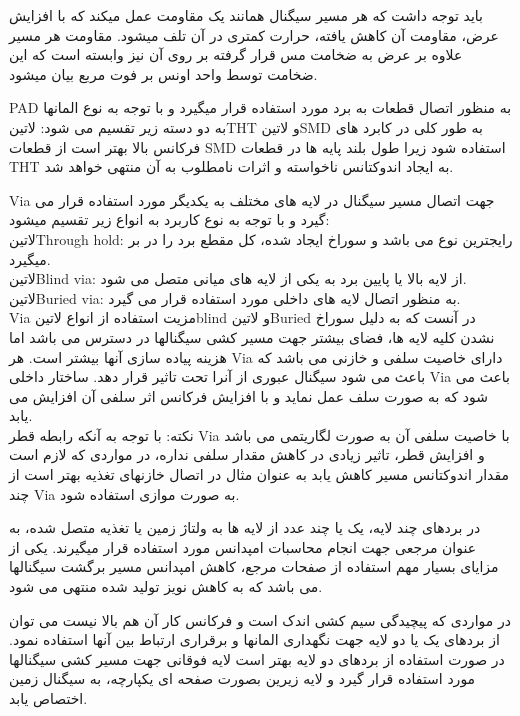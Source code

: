 باید توجه داشت که هر مسیر سیگنال همانند یک مقاومت عمل میکند که با افزایش عرض، مقاومت آن کاهش یافته، حرارت کمتری در آن تلف میشود. مقاومت هر مسیر علاوه بر عرض به ضخامت مس قرار گرفته بر روی آن نیز وابسته است که این ضخامت توسط واحد اونس بر فوت مربع بیان میشود.

PAD
به منظور اتصال قطعات به برد مورد استفاده قرار میگیرد و با توجه به نوع المانها به دو دسته زیر تقسیم می شود: ‌لاتین{THT} و ‌لاتین{SMD} به طور کلی در کابرد های فرکانس بالا بهتر است از قطعات SMD استفاده شود زیرا طول بلند پایه ها در قطعات THT به ایجاد اندوکتانس ناخواسته و اثرات نامطلوب به آن منتهی خواهد شد.

Via
جهت اتصال مسیر سیگنال در لایه های مختلف به یکدیگر مورد استفاده قرار می گیرد و با توجه به نوع کاربرد به انواع زیر تقسیم میشود:\\
‌لاتین{Through hold}: رایجترین نوع می باشد و سوراخ ایجاد شده، کل مقطع برد را در بر میگیرد.\\
‌لاتین{Blind via}: از لایه بالا یا پایین برد به یکی از لایه های میانی متصل می شود.\\
‌لاتین{Buried via}: به منظور اتصال لایه های داخلی مورد استفاده قرار می گیرد.\\
Via
مزیت استفاده از انواع ‌لاتین{blind} و ‌لاتین{Buried} در آنست که به دلیل سوراخ نشدن کلیه لایه ها، فضای بیشتر جهت مسیر کشی سیگنالها در دسترس می باشد اما هزینه پیاده سازی آنها بیشتر است.
هر Via دارای خاصیت سلفی و خازنی می باشد که باعث می شود سیگنال عبوری از آنرا تحت تاثیر قرار دهد.
ساختار داخلی Via باعث می شود که به صورت سلف عمل نماید و با افزایش فرکانس اثر سلفی آن افزایش می یابد. \\
نکته: با توجه به آنکه رابطه قطر Via با خاصیت سلفی آن به صورت لگاریتمی می باشد و افزایش قطر، تاثیر زیادی در کاهش مقدار سلفی نداره، در مواردی که لازم است مقدار اندوکتانس مسیر کاهش یابد به عنوان مثال در اتصال خازنهای تغذیه بهتر است از چند Via به صورت موازی استفاده شود.

در بردهای چند لایه، یک یا چند عدد از لایه ها به ولتاژ زمین یا تغذیه متصل شده، به عنوان مرجعی جهت انجام محاسبات امپدانس مورد استفاده قرار میگیرند. یکی از مزایای بسیار مهم استفاده از صفحات مرجع، کاهش امپدانس مسیر برگشت سیگنالها می باشد که به کاهش نویز تولید شده منتهی می شود.

در مواردی که پیچیدگی سیم کشی اندک است و فرکانس کار آن هم بالا نیست می توان از بردهای یک یا دو لایه جهت نگهداری المانها و برقراری ارتباط بین آنها استفاده نمود. در صورت استفاده از بردهای دو لایه بهتر است لایه فوقانی جهت مسیر کشی سیگنالها مورد استفاده قرار گیرد و لایه زیرین بصورت صفحه ای یکپارچه، به سیگنال زمین اختصاص یابد.

